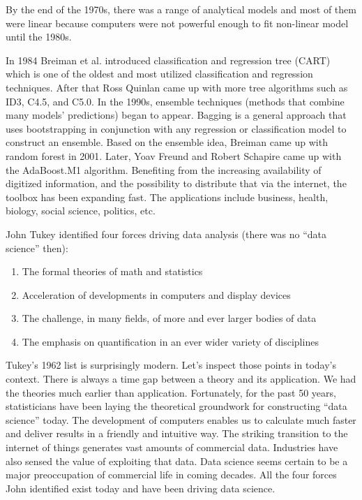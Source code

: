 \documentclass[12pt,]{krantz}
\providecommand{\tightlist}{%
  \setlength{\itemsep}{0pt}\setlength{\parskip}{0pt}}
\theoremstyle{definition}
\theoremstyle{definition}
\theoremstyle{remark}
\begin{document}
By the end of the 1970s, there was a range of analytical models and most
of them were linear because computers were not powerful enough to fit
non-linear model until the 1980s.

In 1984 Breiman et al. introduced classification and regression tree
(CART) which is one of the oldest and most utilized classification and
regression techniques. After that Ross Quinlan came up with more tree
algorithms such as ID3, C4.5, and C5.0. In the 1990s, ensemble
techniques (methods that combine many models' predictions) began to
appear. Bagging is a general approach that uses bootstrapping in
conjunction with any regression or classification model to construct an
ensemble. Based on the ensemble idea, Breiman came up with random forest
in 2001. Later, Yoav Freund and Robert Schapire came up with the
AdaBoost.M1 algorithm. Benefiting from the increasing availability of
digitized information, and the possibility to distribute that via the
internet, the toolbox has been expanding fast. The applications include
business, health, biology, social science, politics, etc.

John Tukey identified four forces driving data analysis (there was no
``data science'' then):

\begin{enumerate}
\def\labelenumi{\arabic{enumi}.}
\tightlist
\item
  The formal theories of math and statistics
\item
  Acceleration of developments in computers and display devices
\item
  The challenge, in many fields, of more and ever larger bodies of data
\item
  The emphasis on quantification in an ever wider variety of disciplines
\end{enumerate}

Tukey's 1962 list is surprisingly modern. Let's inspect those points in
today's context. There is always a time gap between a theory and its
application. We had the theories much earlier than application.
Fortunately, for the past 50 years, statisticians have been laying the
theoretical groundwork for constructing ``data science'' today. The
development of computers enables us to calculate much faster and deliver
results in a friendly and intuitive way. The striking transition to the
internet of things generates vast amounts of commercial data. Industries
have also sensed the value of exploiting that data. Data science seems
certain to be a major preoccupation of commercial life in coming
decades. All the four forces John identified exist today and have been
driving data science.
\end{document}
